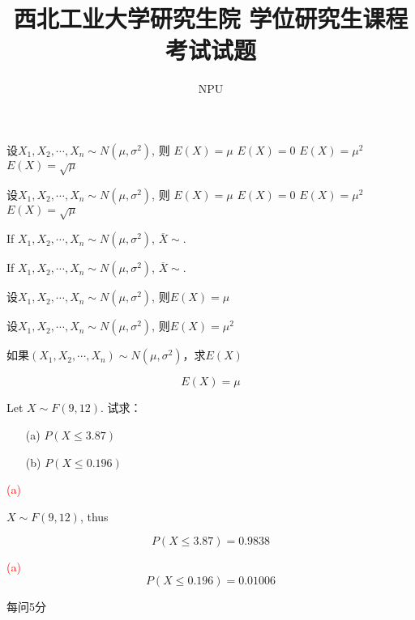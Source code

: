 \documentclass[answer]{NPUExam}
\title{西北工业大学研究生院
学位研究生课程考试试题}
\author{NPU}
\newcommand\alert{\vspace{0.5em}\noindent\textcolor{red}}
\begin{document}
\vspace{1cm}
\makehead

\vspace{1cm}


\begin{problem}
设$X_1,X_2,\cdots,X_n \sim N(\mu,\sigma^2)$, 则
\options
{$E(X)= \mu$}
{$E(X)= 0$}
{$E(X)= \mu^2$}
{$E(X)= \sqrt{\mu}$}
\end{problem}

\begin{problem}
设$X_1,X_2,\cdots,X_n \sim N(\mu,\sigma^2)$, 则
\options
{$E(X)= \mu$}
{$E(X)= 0$}
{$E(X)= \mu^2$}
{$E(X)= \sqrt{\mu}$}
\end{problem}



\begin{problem}
If $X_1,X_2,\cdots,X_n \sim N(\mu,\sigma^2)$, $\overline{X}\sim$.
\end{problem}

\begin{problem}
If $X_1,X_2,\cdots,X_n \sim N(\mu,\sigma^2)$, $\overline{X}\sim$.
\end{problem}


\begin{problem}
设$X_1,X_2,\cdots,X_n \sim N(\mu,\sigma^2)$, 则$E(X)= \mu$ \pickout{\cmark}
\end{problem}

\begin{problem}
设$X_1,X_2,\cdots,X_n \sim N(\mu,\sigma^2)$, 则$E(X)= \mu^2$ \pickout{\xmark}
\end{problem}

 如果$(X_1,X_2,\cdots,X_n)\sim N(\mu, \sigma^2)$，求$E(X)$

\begin{solution}
$$E(X) = \mu$$
\end{solution}

 Let $X \sim F(9,12)$. 试求：
\begin{itemize}
    \item[(a)] $P(X \leq 3.87)$
    \item[(b)]  $P(X \leq 0.196)$
\end{itemize}

\begin{solution}

\alert{(a)}

$X \sim F(9, 12)$, thus

$$P(X\leq 3.87)=0.9838$$

\alert{(a)}
$$P(X\leq 0.196)=0.01006$$

\begin{note}
 每问5分
\end{note}
\end{solution}
\bigskip
\end{document}
